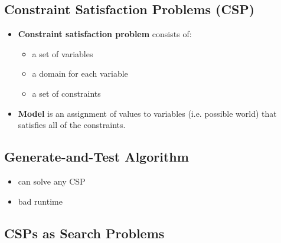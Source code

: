 \documentclass{article}
\begin{document}
\subsection{Constraint Satisfaction Problems (CSP)}

\begin{itemize}
    \item \textbf{Constraint satisfaction problem} consists of:
    \begin{itemize}
        \item a set of variables
        \item a domain for each variable
        \item a set of constraints
    \end{itemize}
    \item \textbf{Model} is an assignment of values to variables (i.e. possible world) that satisfies all of the constraints.
\end{itemize}

\subsection{Generate-and-Test Algorithm}

\begin{algorithmic}
                    \State {}
                \EndIf
            \EndFor
        \EndFor
    \EndFor
    \State {}
\end{algorithmic}

\begin{itemize}
    \item can solve any CSP
    \item bad runtime
\end{itemize}

\subsection{CSPs as Search Problems}
\end{document}
